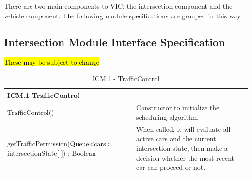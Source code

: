 \documentclass [10pt]{article}
\begin{document}
There are two main components to VIC: the intersection component and the vehicle component. The following module specifications are grouped in this way. 
\subsection{Intersection Module Interface Specification}

    \begin{center}
        \hl{These may be subject to change}
    \end{center}

\begin{longtable}{| p{ } | p{ } | }\caption{ICM.1 -  TrafficControl} \\\hline  
 \multicolumn{2}{|l|}{\textbf {ICM.1 TrafficControl}}\\ \hline
 
\cellcolor{tableCell}TrafficControl()& \cellcolor{tableCell}Constructor to initialize the scheduling algorithm \\ \hline 

getTrafficPermission(Queue<cars>, intersectionState[ ]) : Boolean & When called, it will evaluate all active cars and the current intersection state, then make a decision whether the most recent car can proceed or not. \\ \hline



\end{longtable}
\end{document}
